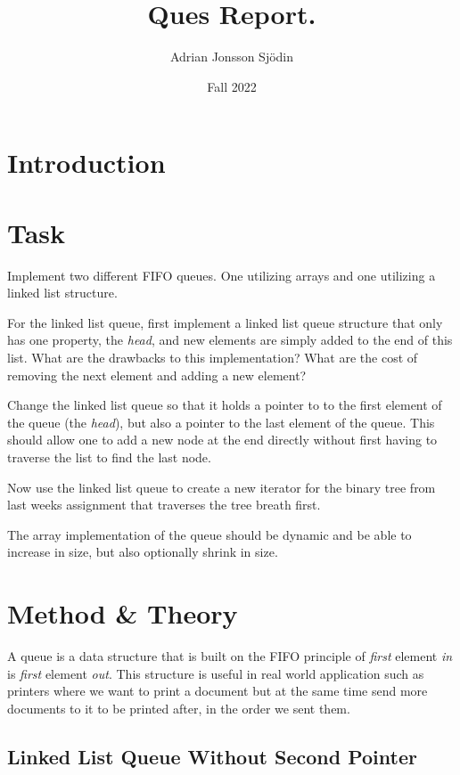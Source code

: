 \documentclass[a4paper,11pt]{article}
\begin{document}
\title{
    \textbf{Ques Report.}
}
\author{Adrian Jonsson Sjödin}
\date{Fall 2022}

\maketitle

\section{Introduction}


\section{Task}
Implement two different FIFO queues. One utilizing arrays and one utilizing a linked list structure.

For the linked list queue, first implement a linked list queue structure that only has one property,
the \textit{head}, and new elements are simply added to the end of this list. What are the drawbacks
to this implementation? What are the cost of removing the next element and adding a new element?

Change the linked list queue so that it holds a pointer to to the first element of the queue
(the \textit{head}), but also a pointer to the last element of the queue. This should allow one
to add a new node at the end directly without first having to traverse the list to find the last
node.

Now use the linked list queue to create a new iterator for the binary tree from last weeks assignment
that traverses the tree breath first.

The array implementation of the queue  should be dynamic and be able to increase in size, but also
optionally shrink in size.
\section{Method \& Theory}
A queue is a data structure that is built on the FIFO principle of \textit{first} element \textit{in} is \textit{first}
element \textit{out}. This structure is useful in real world application such as printers where we want to print a document but
at the same time send more documents to it to be printed after, in the order we sent them.
\subsection{Linked List Queue Without Second Pointer}
\end{document}
